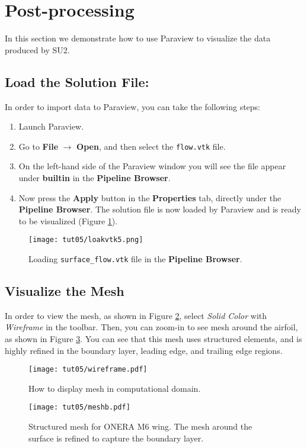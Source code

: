 \section*{Post-processing}
In this section we demonstrate how to use Paraview to visualize the data produced by SU2.
\subsection{Load the Solution File:}
In order to import data to Paraview, you can take the following steps:
\begin{enumerate}[label=\arabic*)]
	\setcounter{enumi}{0}
	\item Launch Paraview.
	\item Go to \textbf{File} $\rightarrow$ \textbf{Open}, and then select the \texttt{flow.vtk} file.
	\item On the left-hand side of the Paraview window you will see the file appear under \textbf{builtin} in the \textbf{Pipeline Browser}.
	\item Now press the \textbf{Apply} button in the \textbf{Properties} tab, directly under the \textbf{Pipeline Browser}. The solution file is now loaded by Paraview and is ready to be visualized (Figure \ref{fig5:load}).
\end{enumerate}
\begin{figure}[ht]
    \centering
    \texttt{[image: tut05/loakvtk5.png]}
    \caption{Loading \texttt{surface\_flow.vtk} file in the \textbf{Pipeline Browser}.}
    \label{fig5:load}
\end{figure}
\subsection{Visualize the Mesh}
In order to view the mesh, as shown in Figure \ref{fig5:wireframe}, select \textit{Solid Color} with \textit{Wireframe} in the toolbar. Then, you can zoom-in to see mesh around the airfoil, as shown in Figure \ref{fig5:mesh}. You can see that this mesh uses structured elements, and is highly refined in the boundary layer, leading edge, and trailing edge regions.
\begin{figure}[ht]
    \centering
    \texttt{[image: tut05/wireframe.pdf]}
    \caption{How to display mesh in computational domain.}
    \label{fig5:wireframe}
\end{figure}
\begin{figure}[ht]
    \centering
    \texttt{[image: tut05/meshb.pdf]}
    \caption{Structured mesh for ONERA M6 wing. The mesh around the surface is refined to capture the boundary layer.}
    \label{fig5:mesh}
\end{figure}
